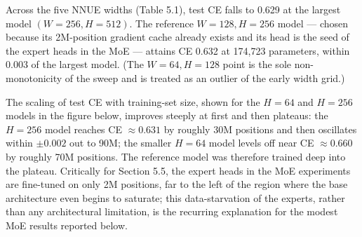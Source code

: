 \begin{table}[H]
\centering
\caption{Dense baselines (linear, single-hidden FFNN, dual-hidden FFNN) with full regression metrics and inference throughput on the 1.5M-position test set. The reference NNUE W128 H256 (174,723 parameters) attains CE 0.632, beating the dual-hidden FFNN2 H256 at 2.9$\times$ the parameters.}
\end{table}


Across the five NNUE widths (Table 5.1), test CE falls to 0.629 at the largest model $(W{=}256,H{=}512)$. The reference $W{=}128,H{=}256$ model --- chosen because its 2M-position gradient cache already exists and its head is the seed of the expert heads in the MoE --- attains CE 0.632 at 174,723 parameters, within 0.003 of the largest model. (The $W{=}64,H{=}128$ point is the sole non-monotonicity of the sweep and is treated as an outlier of the early width grid.)

The scaling of test CE with training-set size, shown for the $H=64$ and $H=256$ models in the figure below, improves steeply at first and then plateaus: the $H=256$ model reaches CE $\approx 0.631$ by roughly 30M positions and then oscillates within $\pm 0.002$ out to 90M; the smaller $H=64$ model levels off near CE $\approx 0.660$ by roughly 70M positions. The reference model was therefore trained deep into the plateau. Critically for Section 5.5, the expert heads in the MoE experiments are fine-tuned on only 2M positions, far to the left of the region where the base architecture even begins to saturate; this data-starvation of the experts, rather than any architectural limitation, is the recurring explanation for the modest MoE results reported below.


